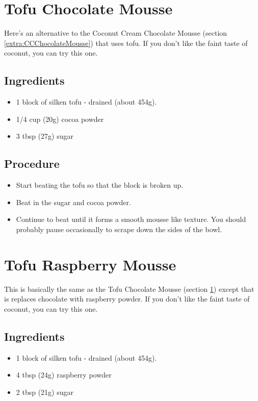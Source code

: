 \documentclass[10pt, openany]{book}
\begin{document}
\section{Tofu Chocolate Mousse}
\label{extra:TofuChocolateMousse}
Here's an alternative to the Coconut Cream Chocolate Mousse (section \ref{extra:CCChocolateMousse}) that uses tofu.  If you don't like the faint taste of coconut, you can try this one.
\subsection{Ingredients}
\begin{itemize}
  \item 1 block of silken tofu - drained (about 454g).
  \item 1/4 cup (20g) cocoa powder
  \item 3 tbsp (27g) sugar
\end{itemize}
\subsection{Procedure}
\begin{itemize}
  \item Start beating the tofu so that the block is broken up.
  \item Beat in the sugar and cocoa powder.
  \item Continue to beat until it forms a smooth mousse like texture.  You should probably pause occasionally to scrape down the sides of the bowl.
\end{itemize}

\section{Tofu Raspberry Mousse}
\label{extra:TofuRaspberryMousse}
This is basically the same as the Tofu Chocolate Mousse (section \ref{extra:TofuChocolateMousse}) except that is replaces chocolate with raspberry powder.  If you don't like the faint taste of coconut, you can try this one.
\subsection{Ingredients}
\begin{itemize}
  \item 1 block of silken tofu - drained (about 454g).
  \item 4 tbsp (24g) raspberry powder
  \item 2 tbsp (21g) sugar
\end{itemize}
\end{document}

